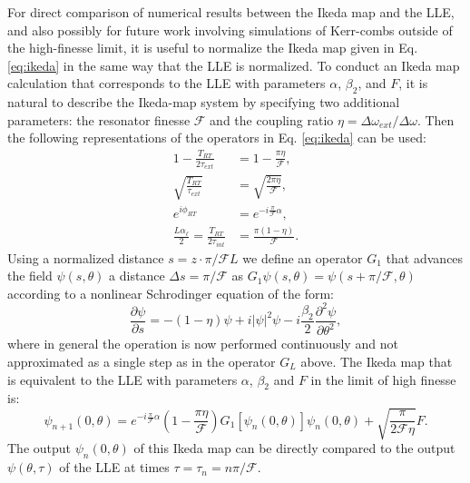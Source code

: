 For direct comparison of numerical results between the Ikeda map and the LLE, and also possibly for future work involving simulations of Kerr-combs outside of the high-finesse limit, it is useful to normalize the Ikeda map given in Eq. \ref{eq:ikeda} in the same way that the LLE is normalized. To conduct an Ikeda map calculation that corresponds to the LLE with parameters $\alpha$, $\beta_2$, and $F$, it is natural to describe the Ikeda-map system by specifying two additional parameters: the resonator finesse $\mathcal{F}$ and the coupling ratio $\eta=\Delta\omega_{ext}/\Delta\omega$. Then the following representations of the operators in Eq. \ref{eq:ikeda} can be used:
\begin{align}
1-\frac{T_{RT}}{2\tau_{ext}}&=1-\frac{\pi\eta}{\mathcal{F}},\\
\sqrt{\frac{T_{RT}}{\tau_{ext}}}&=\sqrt{\frac{2\pi\eta}{\mathcal{F}}},\\
e^{i\phi_{RT}}&=e^{-i\frac{\pi}{\mathcal{F}}\alpha},\\
\frac{L\alpha_\ell}{2}=\frac{T_{RT}}{2\tau_{int}}&=\frac{\pi(1-\eta)}{\mathcal{F}}.
\end{align}
Using a normalized distance $s=z\cdot \pi/\mathcal{F}L$ we define an operator $G_1$ that advances the field $\psi(s,\theta)$ a distance $\Delta s=\pi/\mathcal{F}$ as $G_1 \psi(s,\theta)=\psi(s+\pi/\mathcal{F},\theta)$ according to a nonlinear Schrodinger equation of the form:
\begin{equation}
\frac{\partial \psi}{\partial s}= -(1-\eta) \psi+i|\psi|^2 \psi -i \frac{\beta_2}{2} \frac{\partial^2 \psi}{\partial \theta^2},
\end{equation}
where in general the operation is now performed continuously and not approximated as a single step as in the operator $G_L$ above. The Ikeda map that is equivalent to the LLE with parameters $\alpha$, $\beta_2$ and $F$ in the limit of high finesse is:
\begin{equation}
\psi_{n+1}(0,\theta)=e^{-i\frac{\pi}{\mathcal{F}}\alpha}\left(1-\frac{\pi\eta}{\mathcal{F}}\right)G_1\left[\psi_n(0,\theta)\right]\psi_n(0,\theta)+\sqrt{\frac{\pi}{2\mathcal{F}\eta}}F.
\end{equation}
The output $\psi_n(0,\theta)$ of this Ikeda map can be directly compared to the output $\psi(\theta,\tau)$ of the LLE at times $\tau=\tau_n=n\pi/\mathcal{F}$.

%
%
%
%

